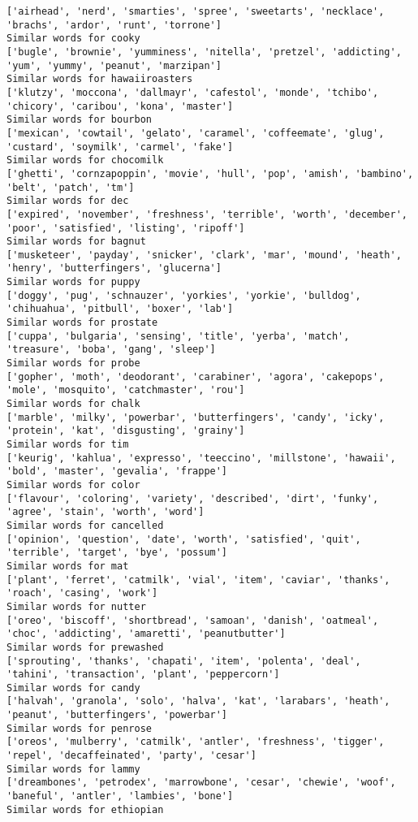 \documentclass[11pt]{article}
\begin{document}
\begin{Verbatim}[commandchars=\\\{\}]
['airhead', 'nerd', 'smarties', 'spree', 'sweetarts', 'necklace', 'brachs', 'ardor', 'runt', 'torrone']
Similar words for cooky
['bugle', 'brownie', 'yumminess', 'nitella', 'pretzel', 'addicting', 'yum', 'yummy', 'peanut', 'marzipan']
Similar words for hawaiiroasters
['klutzy', 'moccona', 'dallmayr', 'cafestol', 'monde', 'tchibo', 'chicory', 'caribou', 'kona', 'master']
Similar words for bourbon
['mexican', 'cowtail', 'gelato', 'caramel', 'coffeemate', 'glug', 'custard', 'soymilk', 'carmel', 'fake']
Similar words for chocomilk
['ghetti', 'cornzapoppin', 'movie', 'hull', 'pop', 'amish', 'bambino', 'belt', 'patch', 'tm']
Similar words for dec
['expired', 'november', 'freshness', 'terrible', 'worth', 'december', 'poor', 'satisfied', 'listing', 'ripoff']
Similar words for bagnut
['musketeer', 'payday', 'snicker', 'clark', 'mar', 'mound', 'heath', 'henry', 'butterfingers', 'glucerna']
Similar words for puppy
['doggy', 'pug', 'schnauzer', 'yorkies', 'yorkie', 'bulldog', 'chihuahua', 'pitbull', 'boxer', 'lab']
Similar words for prostate
['cuppa', 'bulgaria', 'sensing', 'title', 'yerba', 'match', 'treasure', 'boba', 'gang', 'sleep']
Similar words for probe
['gopher', 'moth', 'deodorant', 'carabiner', 'agora', 'cakepops', 'mole', 'mosquito', 'catchmaster', 'rou']
Similar words for chalk
['marble', 'milky', 'powerbar', 'butterfingers', 'candy', 'icky', 'protein', 'kat', 'disgusting', 'grainy']
Similar words for tim
['keurig', 'kahlua', 'expresso', 'teeccino', 'millstone', 'hawaii', 'bold', 'master', 'gevalia', 'frappe']
Similar words for color
['flavour', 'coloring', 'variety', 'described', 'dirt', 'funky', 'agree', 'stain', 'worth', 'word']
Similar words for cancelled
['opinion', 'question', 'date', 'worth', 'satisfied', 'quit', 'terrible', 'target', 'bye', 'possum']
Similar words for mat
['plant', 'ferret', 'catmilk', 'vial', 'item', 'caviar', 'thanks', 'roach', 'casing', 'work']
Similar words for nutter
['oreo', 'biscoff', 'shortbread', 'samoan', 'danish', 'oatmeal', 'choc', 'addicting', 'amaretti', 'peanutbutter']
Similar words for prewashed
['sprouting', 'thanks', 'chapati', 'item', 'polenta', 'deal', 'tahini', 'transaction', 'plant', 'peppercorn']
Similar words for candy
['halvah', 'granola', 'solo', 'halva', 'kat', 'larabars', 'heath', 'peanut', 'butterfingers', 'powerbar']
Similar words for penrose
['oreos', 'mulberry', 'catmilk', 'antler', 'freshness', 'tigger', 'repel', 'decaffeinated', 'party', 'cesar']
Similar words for lammy
['dreambones', 'petrodex', 'marrowbone', 'cesar', 'chewie', 'woof', 'baneful', 'antler', 'lambies', 'bone']
Similar words for ethiopian

\end{Verbatim}
\end{document}
